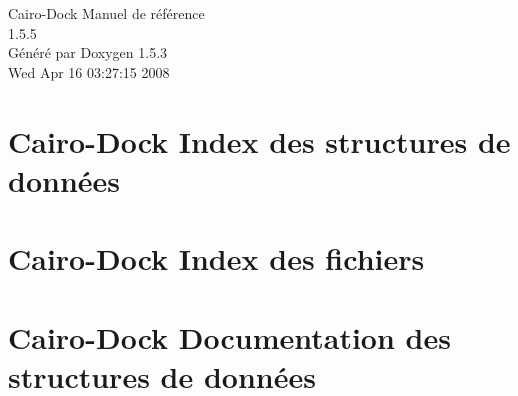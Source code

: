 \documentclass[a4paper]{book}
\begin{document}
\begin{titlepage}
\vspace*{7cm}
\begin{center}
{\Large Cairo-Dock Manuel de référence\\[1ex]\large 1.5.5 }\\
\vspace*{1cm}
{\large Généré par Doxygen 1.5.3}\\
\vspace*{0.5cm}
{\small Wed Apr 16 03:27:15 2008}\\
\end{center}
\end{titlepage}
\clearemptydoublepage
{}
\tableofcontents
\clearemptydoublepage
{}
\chapter{Cairo-Dock Index des structures de données}

\chapter{Cairo-Dock Index des fichiers}

\chapter{Cairo-Dock Documentation des structures de données}

















\end{document}
